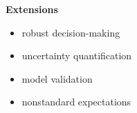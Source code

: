 \begin{frame}

\textbf{Extensions}\vspace{0.5cm}
\begin{itemize}\setlength\itemsep{1em}
\item robust decision-making
\item uncertainty quantification
\item model validation
\item nonstandard expectations
\end{itemize}
\end{frame}

